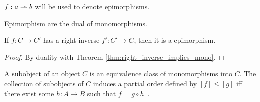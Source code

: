 \begin{remark}
  $f:a\twoheadrightarrow b$ will be used to denote epimorphisms.
\end{remark}

\begin{remark}
  Epimorphism are the dual of monomorphisms.
\end{remark}

\begin{theorem}
  If $f:C\to C'$ has a right inverse $f':C'\to C$, then it is a epimorphism.

  \begin{proof}
    By duality with Theorem \ref{thm:right_inverse_implies_mono}.
  \end{proof}
\end{theorem}

\begin{definition}[Subobject]
  A subobject of an object $C$ is an equivalence class of monomorphisms into
  $C$. The collection of subobjects of $C$ induces a partial order defined by
  $[f]\leq[g]$ iff there exist some $h: A\to B$ such that $f = g\circ
  h$~\parencite[p.~11]{lane_moerdijk:sheaves_geometry_logic}.
\end{definition}